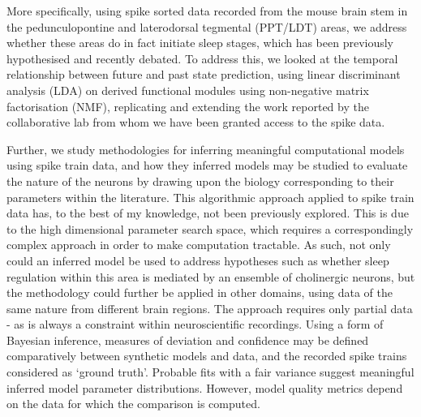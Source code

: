 \documentclass[mphil,deptreport,ai]{infthesis} %
\begin{document}
More specifically, using spike sorted data recorded from the mouse brain stem in the pedunculopontine and laterodorsal tegmental (PPT/LDT) areas, we address whether these areas do in fact initiate sleep stages, which has been previously hypothesised and recently debated. 
To address this, we looked at the temporal relationship between future and past state prediction, using linear discriminant analysis (LDA) on derived functional modules using non-negative matrix factorisation (NMF), replicating and extending the work reported by the collaborative lab from whom we have been granted access to the spike data.

Further, we study methodologies for inferring meaningful computational models using spike train data, and how they inferred models may be studied to evaluate the nature of the neurons by drawing upon the biology corresponding to their parameters within the literature.
This algorithmic approach applied to spike train data has, to the best of my knowledge, not been previously explored. This is due to the high dimensional parameter search space, which requires a correspondingly complex approach in order to make computation tractable.
As such, not only could an inferred model be used to address hypotheses such as whether sleep regulation within this area is mediated by an ensemble of cholinergic neurons, but the methodology could further be applied in other domains, using data of the same nature from different brain regions.
The approach requires only partial data - as is always a constraint within neuroscientific recordings. Using a form of Bayesian inference, measures of deviation and confidence may be defined comparatively between synthetic models and data, and the recorded spike trains considered as ‘ground truth’. Probable fits with a fair variance suggest meaningful inferred model parameter distributions. However, model quality metrics depend on the data for which the comparison is computed.
\end{document}
